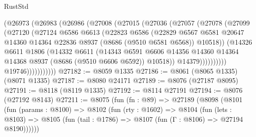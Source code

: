 \begin{lexlean}{RustStd}
\begin{coremodule}
                      (@26973
                        (@26983
                          (@26986
                            (@27008
                              (@27015
                                (@27036
                                  (@27057
                                    (@27078
                                      (@27099
                                        (@27120
                                          (@27124
                                            @6586
                                            @6613
                                            (@22823
                                              @6586
                                              (@22829
                                                @6567
                                                @6581
                                                @20647
                                                @14360
                                                @14364
                                                @22836
                                                @8937
                                                (@8686 (@9510 @6581 @6568))
                                                @10518))
                                            (@14326
                                              @6611
                                              @1806
                                              (@14332
                                                @6611
                                                (@14343
                                                  @6591
                                                  @6606
                                                  @14356
                                                  @14360
                                                  @14364
                                                  @14368
                                                  @8937
                                                  (@8686 (@9510 @6606 @6592))
                                                  @10518))
                                              @14379))))))))))
                          @19746)))))))))))
@27182 := @8059 @1335
@27186 := @8061 (@8065 @1335) (@8071 @1335)
@27187 := @8080 @24171
@27189 := @8076 (@27187 @8095)
@27191 := @8118 (@8119 @1335)
@27192 := @8114 @27191
@27194 := @8076 (@27192 @8143)
@27211 := @8075
    (fun (fn : @89) =>
    @27189
      (@8098
        (@8101
          (fun (params : @8100) =>
          @8102
            (fun (rty : @1602) =>
            @8104
              (fun (lets : @8103) =>
              @8105 (fun (tail : @1786) => @8107 (fun (Γ : @8106) => @27194 @8190))))))

\end{coremodule}
\end{lexlean}
